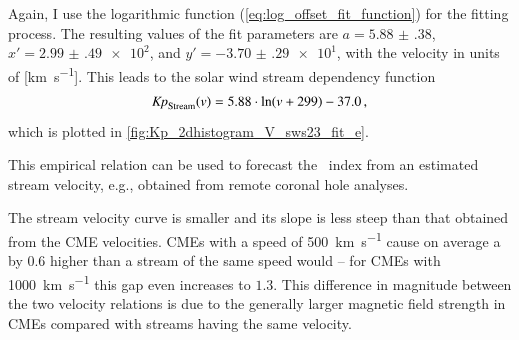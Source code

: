 Again, I use the logarithmic function (\ref{eq:log_offset_fit_function}) for the fitting process. The resulting values of the fit parameters are \mbox{$a = \num{5.88(38)}$}, $x' = \num{2.99(49)e2}$, and $y' = \num{-3.70(29)e1}$, with the velocity in units of [\si{\km\per\s}].
This leads to the solar wind stream dependency function
\begin{align}
	\text{\textit{Kp}}_\text{Stream}(v) = 5.88 \cdot \ln(v + 299) - 37.0	\,,	\label{eq:kpvsv_stream_dependency_function}
\end{align}
which is plotted in \autoref{fig:Kp_2dhistogram_V_sws23_fit_e}.
\begin{figure}
\end{figure}
This empirical relation can be used to forecast the \Kp~index from an estimated stream velocity, e.g., obtained from remote coronal hole analyses.

The stream velocity curve is smaller and its slope is less steep than that obtained from the CME velocities. CMEs with a speed of \SI{500}{\km\per\s} cause on average a by $0.6$ higher \Kp{} than a stream of the same speed would -- for CMEs with \SI{1000}{\km\per\s} this gap even increases to $1.3$. This difference in \Kp{} magnitude between the two velocity relations is due to the generally larger magnetic field strength in CMEs compared with streams having the same velocity.


